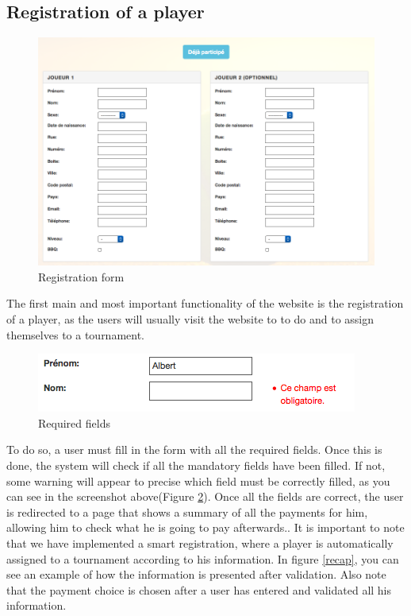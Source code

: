 \documentclass[a4paper, 12pt]{article}
\begin{document}
\subsection*{Registration of a player}

\begin{figure}[h]
\caption{\label{register} Registration form}
\includegraphics[scale=0.5]{playerform.png}
\end{figure}
\FloatBarrier

The first main and most important functionality of the website is the registration of a player, as the users will usually visit the website to to do and to assign themselves to a tournament.\\

\begin{figure}[h]
\caption{\label{obligatoire} Required fields}
\includegraphics[scale=0.7]{obligatoire.png}
\end{figure}
\FloatBarrier

To do so, a user must fill in the form with all the required fields. Once this is done, the system will check if all the mandatory fields have been filled. If not, some warning will appear to precise which field must be correctly filled, as you can see in the screenshot above(Figure \ref{obligatoire}). Once all the fields are correct, the user is redirected to a page that shows a summary of all the payments for him, allowing him to check what he is going to pay afterwards.. It is important to note that we have implemented a smart registration, where a player is automatically assigned to a tournament according to his information. In figure \ref{recap}, you can see an example of how the information is presented after validation. Also note that the payment choice is chosen after a user has entered and validated all his information.\\
\end{document}
